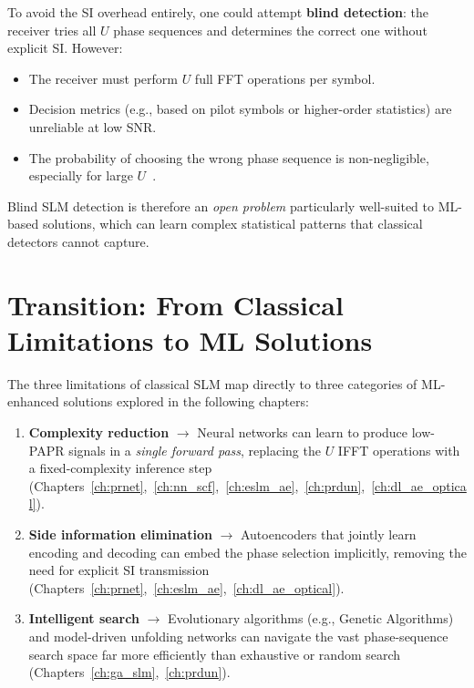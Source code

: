 To avoid the SI overhead entirely, one could attempt \textbf{blind detection}:
the receiver tries all $U$ phase sequences and determines the correct one
without explicit SI.  However:
\begin{itemize}
    \item The receiver must perform $U$ full FFT operations per symbol.
    \item Decision metrics (e.g., based on pilot symbols or higher-order
          statistics) are unreliable at low SNR.
    \item The probability of choosing the wrong phase sequence is
          non-negligible, especially for large $U$~\cite{da2024survey}.
\end{itemize}

Blind SLM detection is therefore an \emph{open problem} particularly
well-suited to ML-based solutions, which can learn complex statistical
patterns that classical detectors cannot capture.


\section{Transition: From Classical Limitations to ML Solutions}
\label{sec:transition}

The three limitations of classical SLM map directly to three categories of
ML-enhanced solutions explored in the following chapters:

\begin{enumerate}
    \item \textbf{Complexity reduction} $\longrightarrow$
          Neural networks can learn to produce low-PAPR signals in a
          \emph{single forward pass}, replacing the $U$ IFFT operations
          with a fixed-complexity inference step
          (Chapters~\ref{ch:prnet},~\ref{ch:nn_scf},~\ref{ch:eslm_ae},~\ref{ch:prdun},~\ref{ch:dl_ae_optical}).

    \item \textbf{Side information elimination} $\longrightarrow$
          Autoencoders that jointly learn encoding and decoding can
          embed the phase selection implicitly, removing the need for
          explicit SI transmission
          (Chapters~\ref{ch:prnet},~\ref{ch:eslm_ae},~\ref{ch:dl_ae_optical}).

    \item \textbf{Intelligent search} $\longrightarrow$
          Evolutionary algorithms (e.g., Genetic Algorithms) and
          model-driven unfolding networks can navigate the vast
          phase-sequence search space far more efficiently than
          exhaustive or random search
          (Chapters~\ref{ch:ga_slm},~\ref{ch:prdun}).
\end{enumerate}

